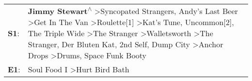 \begin{supertabular}{p{0.03\textwidth}p{0.92\textwidth}}
 \textbf{S1}:  &  \textbf{Jimmy Stewart\textsuperscript{$\wedge$}} \textgreater \enspace Syncopated Strangers\textsuperscript{}, \enspace Andy's Last Beer\textsuperscript{} \textgreater \enspace Get In The Van\textsuperscript{} \textgreater \enspace Roulette[1]\textsuperscript{} \textgreater \enspace Kat's Tune\textsuperscript{}, \enspace Uncommon[2]\textsuperscript{}, \enspace The Triple Wide\textsuperscript{} \textgreater \enspace The Stranger\textsuperscript{} \textgreater \enspace Walletsworth\textsuperscript{} \textgreater \enspace The Stranger\textsuperscript{}, \enspace Der Bluten Kat\textsuperscript{}, \enspace 2nd Self\textsuperscript{}, \enspace Dump City\textsuperscript{} \textgreater \enspace Anchor Drops\textsuperscript{} \textgreater \enspace Drums\textsuperscript{}, \enspace Space Funk Booty\textsuperscript{}  \enspace  \\
 \textbf{E1}:  &                                                                                                                                                                                                                                                                                                                                                                                                                                                                                                                                                                                                                                                                                                                                                               Soul Food I\textsuperscript{} \textgreater \enspace Hurt Bird Bath\textsuperscript{}  \enspace  \\
\end{supertabular}
